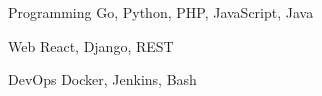 

\begin{cvskills}

  \cvskill
    {Programming} %
    {Go, Python, PHP, JavaScript, Java} %

  \cvskill
    {Web} %
    {React, Django, REST} %
    
  \cvskill
    {DevOps}
    {Docker, Jenkins, Bash}


\end{cvskills}
